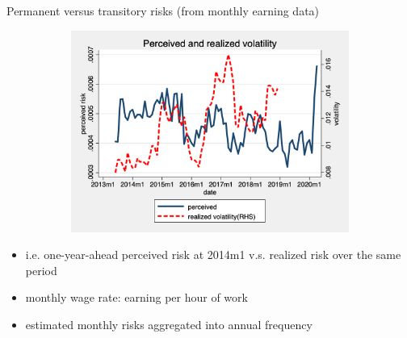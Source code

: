 \documentclass{beamer}
\begin{document}
\begin{frame}{Permanent versus transitory risks (from monthly earning data)}
\begin{figure}[ht]
\begin{subfigure}[b]{0.32\textwidth}
		\includegraphics[width=\textwidth]{figures/real_volatility_compare.png}
	\end{subfigure} 
	\end{figure}
	\begin{itemize}
		\item i.e. one-year-ahead perceived risk at 2014m1 v.s. realized risk over the same period
		\item monthly wage rate: earning per hour of work
		\item estimated monthly risks aggregated into annual frequency 
	\end{itemize}
\hyperlink{appendix:monthly_inequality_vol}{} 
\hyperlink{appendix:monthly_decomposition_compare_psid}{} 
\end{frame}
\end{document}
